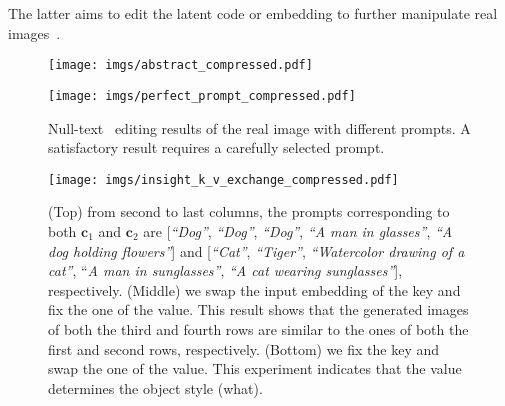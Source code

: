 \documentclass[twocolumn]{svjour3}          \smartqed  \usepackage{graphicx}
\begin{document}
The latter aims to edit the latent code or embedding to further manipulate real images~\citep{Kawar2022ImagicTR,meng2021sdedit,cao2023masactrl,zhang2023adding,couairon2022diffedit}.



\begin{figure*}
\centering
        \texttt{[image: imgs/abstract\_compressed.pdf]}    \vspace{-6mm}
        \label{fig:teaser}
\end{figure*}


\begin{figure*}[t]
    \centering
\texttt{[image: imgs/perfect\_prompt\_compressed.pdf]}\vspace{-2mm}
        \caption{Null-text~\citep{mokady2022null} editing results of the real image with different prompts. A satisfactory result requires a carefully selected  prompt.}
    \label{fig:perfect_prompt}\vspace{-2mm}
\end{figure*}

\begin{figure}[t]
    \centering
\texttt{[image: imgs/insight\_k\_v\_exchange\_compressed.pdf]}\vspace{-2mm}
        \caption{(Top) from second to last columns,  the prompts corresponding to both $\mathbf{c}_1$ and $\mathbf{c}_2$  are [\textit{“Dog”}, \textit{“Dog”}, \textit{“Dog”}, \textit{“A man in glasses”}, \textit{“A dog holding flowers”}] and [\textit{“Cat”}, \textit{“Tiger”}, \textit{“Watercolor drawing of a cat”}, “\textit{A man in sunglasses”}, \textit{“A cat wearing sunglasses”}], respectively. (Middle) we swap the input embedding of the key and fix the one of the value. This result shows that the generated images of both the third and fourth rows are similar to the ones of both the first and second rows, respectively. (Bottom) we fix the key and swap the one of the value. This experiment indicates that the value determines the object style (what). }
    \label{fig:k_v_exchange}\vspace{-2mm}
\end{figure}
\end{document}
